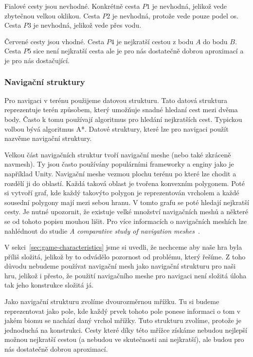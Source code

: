 Fialové cesty jsou nevhodné. Konkrétně cesta $P1$ je nevhodná, jelikož vede zbytečnou velkou oklikou. Cesta $P2$ je nevhodná, protože vede pouze podel os. Cesta $P3$ je nevhodná, jelikož vede přes vodu.

Červené cesty jsou vhodné. Cesta $P4$ je nejkratší cestou z bodu $A$ do bodu $B$. Cesta $P5$ sice není nejkratší cesta ale je pro nás dostatečně dobrou aproximací a je pro nás dostačující.


\subsubsection{Navigační struktury}
Pro navigaci v terénu použijeme datovou strukturu. Tato datová struktura reprezentuje terén způsobem, který umožňuje snadné hledaní cest mezi dvěma body. Často k tomu používají algoritmus pro hledání nejkratších cest. Typickou volbou bývá algoritmus A*. Datové struktury, které lze pro navigaci použít nazvěme navigační struktury.

Velkou část navigačních struktur tvoří navigační meshe (nebo také zkráceně navmesh). Ty jsou často používány populárními frameworky a enginy jako je například Unity. Navigační meshe vezmou plochu terénu po které lze chodit a rozdělí ji do oblastí. Každá taková oblast je tvořena konvexním polygonem. Poté si vytvoří graf, kde každý takovýto polygon je reprezentován vrcholem a každé sousední polygony mají mezi sebou hranu. V tomto grafu se poté hledají nejkratší cesty. Je nutné upozornit, že existuje velké množství navigačních meshů a některé se od tohoto popisu mouhou lišit. Pro více informacích o navigačních meshích lze nahlédnout do studie \textit{A comparative study of navigation meshes}~\cite{10.1145/2994258.2994262}.

V sekci~\ref{sec:game-characteristics} jsme si uvedli, že nechceme aby naše hra byla příliš složitá, jelikož by to odvádělo pozornost od problému, který řešíme. Z toho důvodu nebudeme používat navigační mesh jako navigační strukturu pro naši hru, jelikož i přesto, že použití navigačního meshe pro navigaci není složitá úloha tak jeho konstrukce složitá já.

Jako navigační strukturu zvolíme dvourozměrnou mřížku. Tu si budeme reprezentovat jako pole, kde každý prvek tohoto pole ponese informaci o tom v jakém biomu se nachází daný vrchol mřížky. Tuto strukturu zvolíme, protože je jednoduchá na konstrukci. Cesty které díky této mřížce získáme nebudou nejlepší možnou nejkratší cestou (a nebudou ve skutečnosti ani nejkratší), ale budou pro nás dostatečně dobrou aproximací. 

